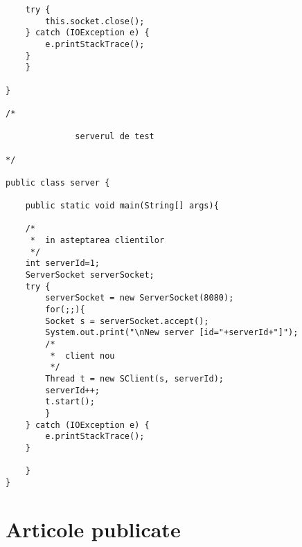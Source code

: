 \begin{lstlisting}
	try {
	    this.socket.close();
	} catch (IOException e) {
	    e.printStackTrace();
	}
    }

}

/*

              serverul de test

*/

public class server {
	
    public static void main(String[] args){
		
	/*
	 *  in asteptarea clientilor
	 */
	int serverId=1;
	ServerSocket serverSocket;
	try {
	    serverSocket = new ServerSocket(8080);
	    for(;;){
		Socket s = serverSocket.accept();
		System.out.print("\nNew server [id="+serverId+"]");
		/*
		 *  client nou
		 */
		Thread t = new SClient(s, serverId);
		serverId++;
		t.start();
	    }
	} catch (IOException e) {
	    e.printStackTrace();
	}

    }
}

\end{lstlisting}








\chapter{Articole publicate}


